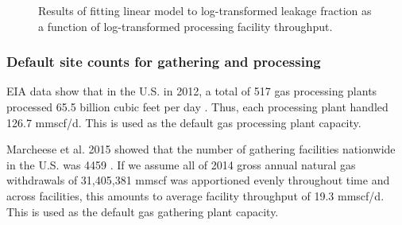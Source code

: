 \documentclass[11pt]{report}
\begin{document}
{{{{\begin{figure}[tb]
\begin{center}
\hfill
{}
\hfill
\caption{Results of fitting linear model to log-transformed leakage fraction as a function of log-transformed processing facility throughput.}
\label{fig:processing_site_VF_fit}
\end{center}
\end{figure}

\subsubsection{Default site counts for gathering and processing}

EIA data show that in the U.S. in 2012, a total of 517 gas processing plants processed 65.5 billion cubic feet per day \cite{EIA2012}. Thus, each processing plant handled 126.7 mmscf/d. This is used as the default gas processing plant capacity.

Marcheese et al. 2015 \cite{Marcheese2015} showed that the number of gathering facilities nationwide in the U.S. was 4459 \cite[
SI Table S12]{Marcheese2015}. If we assume all of 2014 gross annual natural gas withdrawals of 31,405,381 mmscf \cite{EIA2018} was apportioned evenly throughout time and across facilities, this amounts to average facility throughput of 19.3 mmscf/d. This is used as the default gas gathering plant capacity.


}}}}
\end{document}
